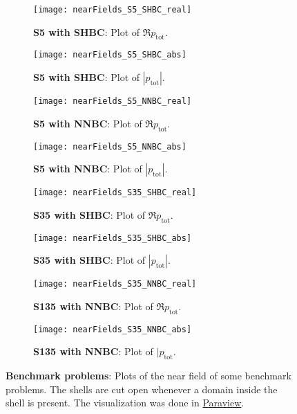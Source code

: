 \begin{figure}
	\centering
	\begin{subfigure}[t]{0.49\textwidth}
		\centering
		\texttt{[image: nearFields\_S5\_SHBC\_real]}
		\caption{\textbf{S5 with SHBC}: Plot of $\Re p_{\mathrm{tot}}$.}
		\label{Fig1:S5_SHBC_real}
	\end{subfigure}%
	\hspace*{0.02\textwidth}%
	\begin{subfigure}[t]{0.49\textwidth}
		\centering
		\texttt{[image: nearFields\_S5\_SHBC\_abs]}
		\caption{\textbf{S5 with SHBC}: Plot of $|p_{\mathrm{tot}}|$.}
		\label{Fig1:S5_SHBC_abs}
	\end{subfigure}%
	\par\bigskip
	\begin{subfigure}[t]{0.49\textwidth}
		\centering
		\texttt{[image: nearFields\_S5\_NNBC\_real]}
		\caption{\textbf{S5 with NNBC}: Plot of $\Re p_{\mathrm{tot}}$.}
		\label{Fig1:S5_NNBC_real}
	\end{subfigure}%
	\hspace*{0.02\textwidth}%
	\begin{subfigure}[t]{0.49\textwidth}
		\centering
		\texttt{[image: nearFields\_S5\_NNBC\_abs]}
		\caption{\textbf{S5 with NNBC}: Plot of $|p_{\mathrm{tot}}|$.}
		\label{Fig1:S5_NNBC_abs}
	\end{subfigure}%
	\par\bigskip
	\begin{subfigure}[t]{0.49\textwidth}
		\centering
		\texttt{[image: nearFields\_S35\_SHBC\_real]}
		\caption{\textbf{S35 with SHBC}: Plot of $\Re p_{\mathrm{tot}}$.}
		\label{Fig1:S35_SHBC_real}
	\end{subfigure}%
	\hspace*{0.02\textwidth}%
	\begin{subfigure}[t]{0.49\textwidth}
		\centering
		\texttt{[image: nearFields\_S35\_SHBC\_abs]}
		\caption{\textbf{S35 with SHBC}: Plot of $|p_{\mathrm{tot}}|$.}
		\label{Fig1:S35_SHBC_abs}
	\end{subfigure}%
	\par\bigskip
	\begin{subfigure}[t]{0.49\textwidth}
		\centering
		\texttt{[image: nearFields\_S35\_NNBC\_real]}
		\caption{\textbf{S135 with NNBC}: Plot of $\Re p_{\mathrm{tot}}$.}
		\label{Fig1:S35_NNBC_real}
	\end{subfigure}%
	\hspace*{0.02\textwidth}%
	\begin{subfigure}[t]{0.49\textwidth}
		\centering
		\texttt{[image: nearFields\_S35\_NNBC\_abs]}
		\caption{\textbf{S135 with NNBC}: Plot of $|p_{\mathrm{tot}}$.}
		\label{Fig1:S35_NNBC_abs}
	\end{subfigure}%
	\caption{\textbf{Benchmark problems}: Plots of the near field of some benchmark problems. The shells are cut open whenever a domain inside the shell is present. The visualization was done in \href{http://www.paraview.org/}{Paraview}.}
	\label{Fig1:Benchmarks_NearField}
\end{figure}

